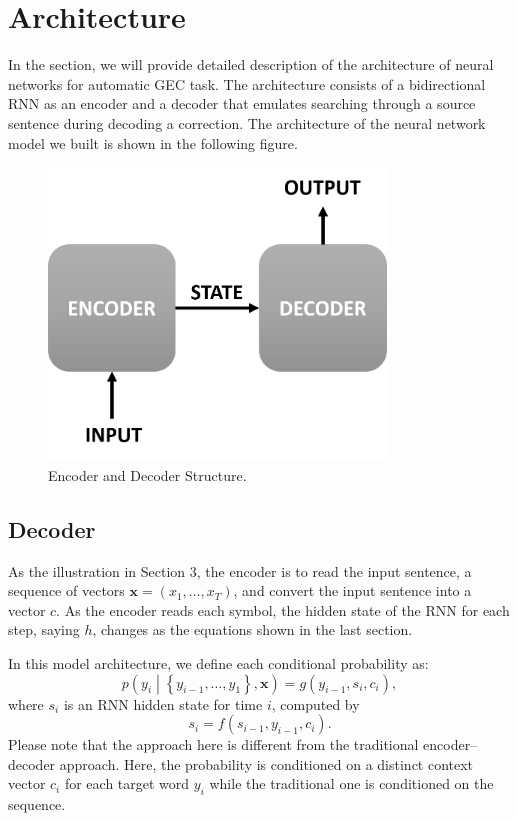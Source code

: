 \chapter{Architecture}
\label{chapter4}


In the section, we will provide detailed description of the architecture of neural networks for automatic GEC task. The architecture consists of a bidirectional RNN as an encoder and a decoder that emulates searching through a source sentence during decoding a correction. The architecture of the neural network model we built is shown in the following figure.

\begin{figure}[ht]
    \centering
    \includegraphics[width=0.8\textwidth]{EDA.png}
    \caption{Encoder and Decoder Structure.}
    \label{fig:5}
\end{figure}

\section{Decoder}

As the illustration in Section 3, the encoder is to read the input sentence, a sequence of vectors $\mathbf{x}=\left(x_1,\ldots,x_T\right)$, and convert the input sentence into a vector $c$. As the encoder reads each symbol, the hidden state of the RNN for each step, saying $h$, changes as the equations shown in the last section.

In this model architecture, we define each conditional probability as:
$$p\left(y_i\middle|\left\{y_{i-1},\ldots,y_1\right\},\mathbf{x}\right)=g\left(y_{i-1},s_i,c_i\right),$$
where $s_i$ is an RNN hidden state for time $i$, computed by
$$s_i=f\left(s_{i-1},y_{i-1},c_i\right).$$
Please note that the approach here is different from the traditional encoder–decoder approach. Here, the probability is conditioned on a distinct context vector $c_i$ for each target word $y_i$ while the traditional one is conditioned on the sequence.

